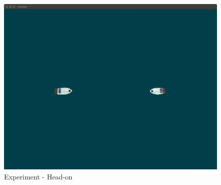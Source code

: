     \begin{figure}[H] 
        \centering
        \includegraphics[scale=0.2]{figs/Experiment_HeadOn_1.png}
        \caption{Experiment - Head-on}
        \label{fig:Experiments_HeadOn_InitialState}
    \end{figure}
    
